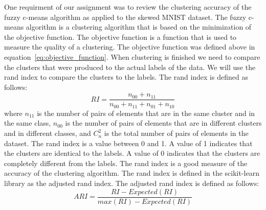 One requirment of our assignment was to review the clustering accuracy of the fuzzy c-means algorithm as applied to the skewed MNIST dataset.
The fuzzy c-means algorithm is a clustering algorithm that is based on the minimization of the objective function. 
The objective function is a function that is used to measure the quality of a clustering. The objective function was defined above in equation~\ref{eq:objective_function}.
When clustering is finished we need to compare the clusters that were produced to the actual labels of the data. We will use the rand index to compare the clusters to the labels. The rand index is defined as follows:
\begin{equation}
\label{eq:rand_index}
RI = \frac{n_{00} + n_{11}}{n_{00} + n_{11} +n_{01} + n_{10}} 
\end{equation}
where $n_{11}$ is the number of pairs of elements that are in the same cluster and in the same class, $n_{00}$ is the number of pairs of elements that are in different clusters and in different classes, and $C_{n}^{2}$ is the total number of pairs of elements in the dataset. The rand index is a value between 0 and 1. A value of 1 indicates that the clusters are identical to the labels. A value of 0 indicates that the clusters are completely different from the labels. The rand index is a good measure of the accuracy of the clustering algorithm. The rand index is defined in the scikit-learn library as the adjusted rand index. The adjusted rand index is defined as follows:
\begin{equation}
\label{eq:adjusted_rand_index}
ARI = \frac{RI - Expected(RI)}{max(RI) - Expected(RI)}
\end{equation}





